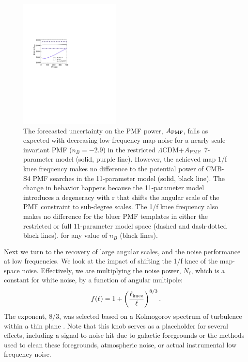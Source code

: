\documentclass[apj]{emulateapj}
\newcommand{\apmf}{\ensuremath{A_{\rm PMF}}}
\newcommand{\lcdm}{\ensuremath{\Lambda}CDM}
\newcommand{\be}{\begin{equation}}
\newcommand{\ee}{\end{equation}}
\begin{document}
\begin{figure}[htb]\centering
\includegraphics[width=0.45\textwidth,clip,trim={1.5cm 12.5cm 11cm 7.5cm}]{pmf_knee.pdf}
  \caption[Map knee dependence]{
  The forecasted uncertainty on the PMF power, \apmf{}, falls as expected with decreasing low-frequency map noise for a nearly scale-invariant PMF ($n_B = -2.9$) in the restricted \lcdm{}+\apmf{} 7-parameter model (solid, purple line). 
  However,  the achieved map 1/f knee frequency makes no difference to the potential power of CMB-S4 PMF searches in the 11-parameter model (solid, black line). 
  The change in behavior happens because the 11-parameter model introduces a degeneracy with r that shifts the angular scale of the PMF constraint to sub-degree scales. 
  The 1/f knee frequency also makes no difference for the bluer PMF templates in either the restricted or full 11-parameter model space (dashed and dash-dotted black lines). 
   for any value of $n_B$ (black lines). 
    \label{fig:knee}
  }
\end{figure}

Next we turn to the recovery of large angular scales, and the noise performance at low frequencies. 
We look at the impact of shifting the 1/f knee of the map-space noise. 
Effectively, we are multiplying the noise power, $N_\ell$, which is a constant for white noise,  by a function of angular multipole:
\be \label{eqn:knee}
f(\ell) = 1 + \left(\frac{\ell_{\rm knee}}{\ell}\right)^{8/3}.
\ee 
The exponent, 8/3, was selected based on a Kolmogorov spectrum of turbulence within a thin plane \citep{lay00}. %
Note that this knob  serves as a placeholder for several effects, including a signal-to-noise hit due to galactic foregrounds or the methods used to clean these foregrounds, atmospheric noise, or actual instrumental low frequency noise. 
\end{document}
